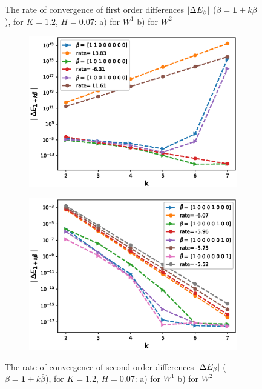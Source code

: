 \documentclass[11pt]{article}
\begin{document}
\begin{figure}[h!]
	
	
	\caption{The rate of convergence of  first order differences $\left\lvert\Delta E_{\beta}\right\rvert$ ($\beta=\mathbf{1}+k \bar{\beta}$), for $K=1.2$, $H=0.07$: a) for $W^1$ b) for $W^2$}
	\label{fig:first_diff_comp_K_12_H_007_wihtout_change_measure}
\end{figure}


\begin{figure}[h!]
	\centering
	\begin{subfigure}{.4\textwidth}
		\centering
		\includegraphics[width=1\linewidth]{./figures/rBergomi_mixed_error_rates/without_change_measure/N_4/H_007/mixed_difference_order2_rbergomi_4steps_H_007_K_12_totally_hierarch_with_rate_W1}
		\caption{}
		\label{fig:sub3}
	\end{subfigure}%
	\begin{subfigure}{.4\textwidth}
		\centering
		\includegraphics[width=1\linewidth]{./figures/rBergomi_mixed_error_rates/without_change_measure/N_4/H_007/mixed_difference_order2_rbergomi_4steps_H_007_K_12_totally_hierarch_with_rate_W2}
		\caption{}
		\label{fig:sub4}
	\end{subfigure}
	
	\caption{The rate of convergence of  second order differences $\left\lvert\Delta E_{\beta}\right\rvert$ ($\beta=\mathbf{1}+k \bar{\beta}$), for $K=1.2$, $H=0.07$: a) for $W^1$ b) for $W^2$}
	\label{fig:second_diff_comp_K_12_H_007_wihtout_change_measure}
\end{figure}
\end{document}
